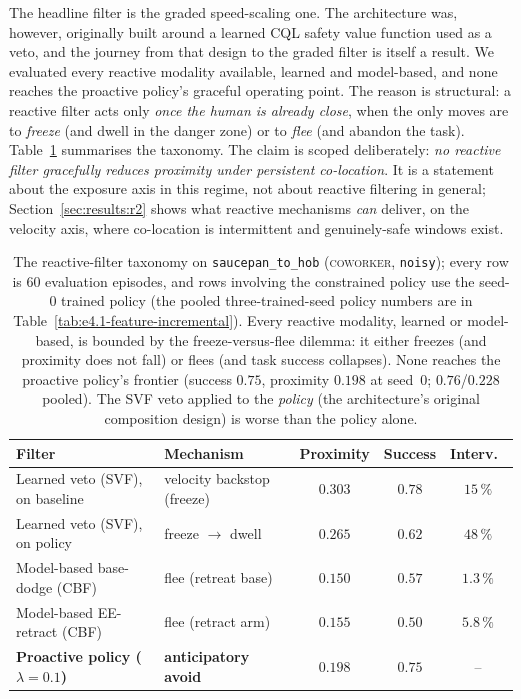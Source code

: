 \documentclass[11pt,a4paper]{report}
\newcommand{\coworker}{\textsc{coworker}}
\begin{document}
The headline filter is the graded speed-scaling one. The architecture
was, however, originally built around a learned \textsc{CQL} safety
value function used as a veto, and the journey from that design to the
graded filter is itself a result. We evaluated every reactive modality
available, learned and model-based, and none reaches the proactive
policy's graceful operating point. The reason is structural: a reactive
filter acts only \emph{once the human is already close}, when the only
moves are to \emph{freeze} (and dwell in the danger zone) or to
\emph{flee} (and abandon the task). Table~\ref{tab:filter-taxonomy}
summarises the taxonomy. The claim is
scoped deliberately: \emph{no reactive filter gracefully reduces
proximity under persistent co-location}. It is a statement about the
exposure axis in this regime, not about reactive filtering in
general; Section~\ref{sec:results:r2} shows what reactive mechanisms
\emph{can} deliver, on the velocity axis, where co-location is
intermittent and genuinely-safe windows exist.

\begin{table}[htbp]
\centering
\caption{The reactive-filter taxonomy on \texttt{saucepan\_to\_hob}
(\coworker{}, \texttt{noisy}); every row is 60 evaluation episodes,
and rows involving the constrained policy use the seed-0 trained
policy (the pooled three-trained-seed policy numbers are in
Table~\ref{tab:e4.1-feature-incremental}). Every reactive modality,
learned or model-based, is bounded by the freeze-versus-flee dilemma:
it either freezes (and proximity does not fall) or flees (and task
success collapses). None reaches the proactive policy's frontier
(success $0.75$, proximity $0.198$ at seed~0; $0.76$/$0.228$ pooled).
The SVF veto applied to the \emph{policy} (the architecture's
original composition design) is worse than the policy alone.}
\label{tab:filter-taxonomy}
\small
\begin{tabular}{llccc}
\toprule
Filter & Mechanism & Proximity & Success & Interv.\ \\
\midrule
Learned veto (SVF), on baseline   & velocity backstop (freeze) & $0.303$ & $0.78$ & $15\,\%$ \\
Learned veto (SVF), on policy     & freeze $\to$ dwell         & $0.265$ & $0.62$ & $48\,\%$ \\
Model-based base-dodge (CBF)      & flee (retreat base)        & $0.150$ & $0.57$ & $1.3\,\%$ \\
Model-based EE-retract (CBF)      & flee (retract arm)         & $0.155$ & $0.50$ & $5.8\,\%$ \\
\textbf{Proactive policy ($\lambda{=}0.1$)} & \textbf{anticipatory avoid} & $\mathbf{0.198}$ & $\mathbf{0.75}$ & -- \\
\bottomrule
\end{tabular}
\end{table}
\end{document}
